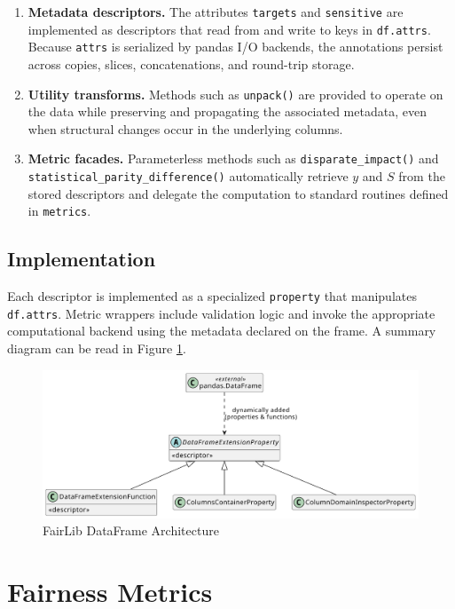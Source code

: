 \documentclass[12pt,a4paper,openright,twoside]{book}
\begin{document}
\begin{enumerate}[label=\alph*)]
  \item \textbf{Metadata descriptors.} The attributes \texttt{targets} and \texttt{sensitive} are implemented as descriptors that read from and write to keys in \texttt{df.attrs}. Because \texttt{attrs} is serialized by pandas I/O backends, the annotations persist across copies, slices, concatenations, and round-trip storage.
  \item \textbf{Utility transforms.} Methods such as \texttt{unpack()} are provided to operate on the data while preserving and propagating the associated metadata, even when structural changes occur in the underlying columns.
  \item \textbf{Metric facades.} Parameterless methods such as \texttt{disparate\_impact()} and \texttt{statistical\_parity\_difference()} automatically retrieve $y$ and $S$ from the stored descriptors and delegate the computation to standard routines defined in \texttt{metrics}.
\end{enumerate}

\subsection{Implementation} Each descriptor is implemented as a specialized \texttt{property} that manipulates \texttt{df.attrs}. Metric wrappers include validation logic and invoke the appropriate computational backend using the metadata declared on the frame. A summary diagram can be read in Figure \ref{fig:df-uml}.

\begin{figure}
\centering
\includegraphics[width=\textwidth]{figures/uml/dataframe.pdf}
\caption{FairLib DataFrame Architecture}
\label{fig:df-uml}
\end{figure}

\section{Fairness Metrics}
\end{document}
